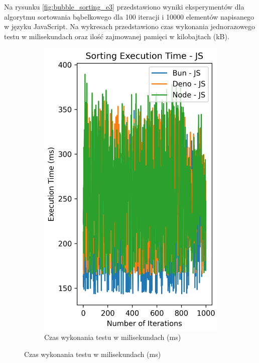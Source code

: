 Na rysunku \ref{fig:bubble_sorting_e3} przedstawiono wyniki eksperymentów dla algorytmu sortowania bąbelkowego dla 100 iteracji i 10000 elementów napisanego w języku JavaScript. Na wykresach przedstawiono czas wykonania jednorazowego testu w milisekundach oraz ilość zajmowanej pamięci w kilobajtach (kB).

\begin{figure}[H]
  \centering
  \begin{subfigure}[b]{0.44\textwidth}
    \centering
    \includegraphics[width=\textwidth]{Figures/sorting/sorting_bubble_1000_10000_js_time.png}
    \caption{Czas wykonania testu w milisekundach (ms)}
    \label{fig:bubble_sorting_e3_time}

\end{subfigure}
\end{figure}
